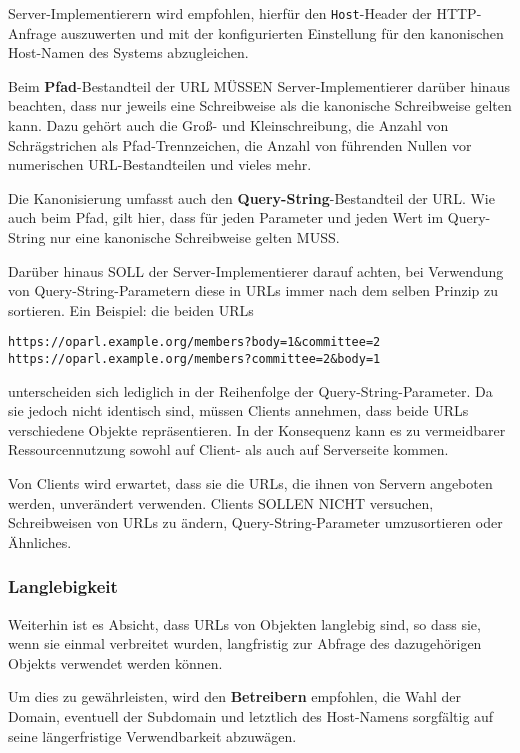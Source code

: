 \documentclass[,a4paper]{article}
\begin{document}
Server-Implementierern wird empfohlen, hierfür den \texttt{Host}-Header
der HTTP-Anfrage auszuwerten und mit der konfigurierten Einstellung für
den kanonischen Host-Namen des Systems abzugleichen.

Beim \textbf{Pfad}-Bestandteil der URL MÜSSEN Server-Implementierer
darüber hinaus beachten, dass nur jeweils eine Schreibweise als die
kanonische Schreibweise gelten kann. Dazu gehört auch die Groß- und
Kleinschreibung, die Anzahl von Schrägstrichen als Pfad-Trennzeichen,
die Anzahl von führenden Nullen vor numerischen URL-Bestandteilen und
vieles mehr.

Die Kanonisierung umfasst auch den \textbf{Query-String}-Bestandteil der
URL. Wie auch beim Pfad, gilt hier, dass für jeden Parameter und jeden
Wert im Query-String nur eine kanonische Schreibweise gelten MUSS.

Darüber hinaus SOLL der Server-Implementierer darauf achten, bei
Verwendung von Query-String-Parametern diese in URLs immer nach dem
selben Prinzip zu sortieren. Ein Beispiel: die beiden URLs

\begin{verbatim}
https://oparl.example.org/members?body=1&committee=2
https://oparl.example.org/members?committee=2&body=1
\end{verbatim}

unterscheiden sich lediglich in der Reihenfolge der
Query-String-Parameter. Da sie jedoch nicht identisch sind, müssen
Clients annehmen, dass beide URLs verschiedene Objekte repräsentieren.
In der Konsequenz kann es zu vermeidbarer Ressourcennutzung sowohl auf
Client- als auch auf Serverseite kommen.

Von Clients wird erwartet, dass sie die URLs, die ihnen von Servern
angeboten werden, unverändert verwenden. Clients SOLLEN NICHT versuchen,
Schreibweisen von URLs zu ändern, Query-String-Parameter umzusortieren
oder Ähnliches.

\subsubsection{Langlebigkeit}\label{langlebigkeit}

Weiterhin ist es Absicht, dass URLs von Objekten langlebig sind, so dass
sie, wenn sie einmal verbreitet wurden, langfristig zur Abfrage des
dazugehörigen Objekts verwendet werden können.

Um dies zu gewährleisten, wird den \textbf{Betreibern} empfohlen, die
Wahl der Domain, eventuell der Subdomain und letztlich des Host-Namens
sorgfältig auf seine längerfristige Verwendbarkeit abzuwägen.
\end{document}
